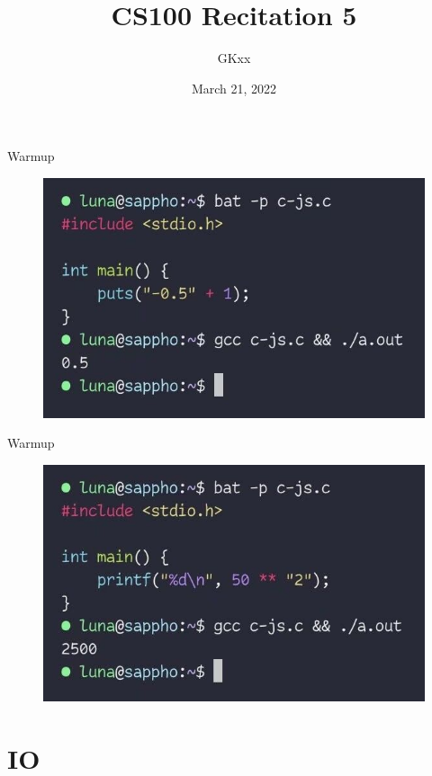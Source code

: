\documentclass{beamer}
\title{CS100 Recitation 5}
\author{GKxx}
\date{March 21, 2022}
\theoremstyle{definition}
\begin{document}
\begin{frame}
    \titlepage
\end{frame}

\begin{frame}{Warmup}
    \begin{figure}[h]
        \centering
        \includegraphics[width=\textwidth]{figures/warmup_1.jpg}
    \end{figure}
\end{frame}

\begin{frame}{Warmup}
    \begin{figure}[h]
        \centering
        \includegraphics[width=\textwidth]{figures/warmup_2.jpg}
    \end{figure}
\end{frame}

\section{IO}
\end{document}
